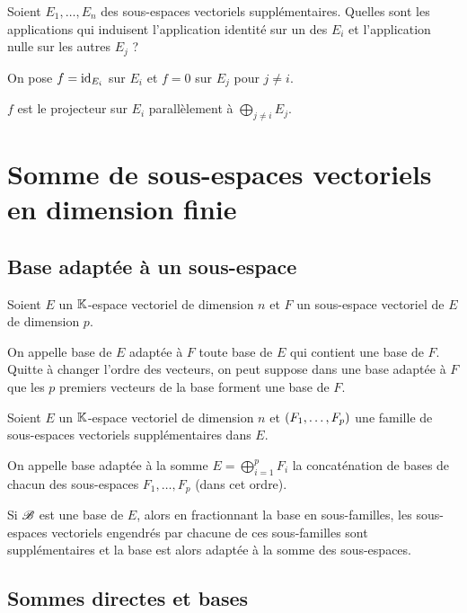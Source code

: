 \begin{exo}
Soient \(E_1,\dots,E_n\) des sous-espaces vectoriels supplémentaires. Quelles sont les applications qui induisent l'application identité sur un des \(E_i\) et l'application nulle sur les autres \(E_j\) ?
\end{exo}

\begin{corr}
On pose \(f=\mathrm{id}_{E_i}\) sur \(E_i\) et \(f=0\) sur \(E_j\) pour \(j\not=i\).

\(f\) est le projecteur sur \(E_i\) parallèlement à \(\bigoplus_{j\not=i}E_j\).
\end{corr}

\section{Somme de sous-espaces vectoriels en dimension finie}

\subsection{Base adaptée à un sous-espace}

\begin{defi}
Soient \(E\) un \(\mathbb{K}\)-espace vectoriel de dimension \(n\) et \(F\) un sous-espace vectoriel de \(E\) de dimension \(p\).

On appelle base de \(E\) adaptée à \(F\) toute base de \(E\) qui contient une base de \(F\). Quitte à changer l'ordre des vecteurs, on peut suppose dans une base adaptée à \(F\) que les \(p\) premiers vecteurs de la base forment une base de \(F\).
\end{defi}

\begin{defi}
Soient \(E\) un \(\mathbb{K}\)-espace vectoriel de dimension \(n\) et \(\left(F_1,\dots,F_p\right)\) une famille de sous-espaces vectoriels supplémentaires dans \(E\).

On appelle base adaptée à la somme \(E=\bigoplus_{i=1}^pF_i\) la concaténation de bases de chacun des sous-espaces \(F_1,\dots,F_p\) (dans cet ordre).
\end{defi}

Si \(\mathscr{B}\) est une base de \(E\), alors en fractionnant la base en sous-familles, les sous-espaces vectoriels engendrés par chacune de ces sous-familles sont supplémentaires et la base est alors adaptée à la somme des sous-espaces.

\subsection{Sommes directes et bases}

